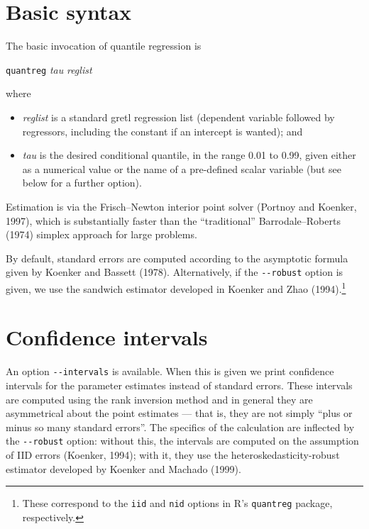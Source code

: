 \section{Basic syntax}

The basic invocation of quantile regression is

\vspace{1em}
\noindent
\qquad \texttt{quantreg} \textsl{tau} \textsl{reglist}
\vspace{1em}

where

\begin{itemize}
\item \textsl{reglist} is a standard \textsf{gretl} regression list
  (dependent variable followed by regressors, including the constant
  if an intercept is wanted); and
\item \textsl{tau} is the desired conditional quantile, in the range
  0.01 to 0.99, given either as a numerical value or the name of a
  pre-defined scalar variable (but see below for a further option).
\end{itemize}

Estimation is via the Frisch--Newton interior point solver (Portnoy
and Koenker, 1997), which is substantially faster than the
``traditional'' Barrodale--Roberts (1974) simplex approach for large
problems.

By default, standard errors are computed according to the asymptotic
formula given by Koenker and Bassett (1978).  Alternatively, if the
\verb|--robust| option is given, we use the sandwich estimator
developed in Koenker and Zhao (1994).\footnote{These correspond to the
  \texttt{iid} and \texttt{nid} options in \textsf{R}'s
  \texttt{quantreg} package, respectively.}

\section{Confidence intervals}

An option \verb|--intervals| is available.  When this is given we
print confidence intervals for the parameter estimates instead of
standard errors.  These intervals are computed using the rank
inversion method and in general they are asymmetrical about the point
estimates --- that is, they are not simply ``plus or minus so many
standard errors''.  The specifics of the calculation are inflected by
the \verb|--robust| option: without this, the intervals are computed
on the assumption of IID errors (Koenker, 1994); with it, they use the
heteroskedasticity-robust estimator developed by Koenker and Machado
(1999).

